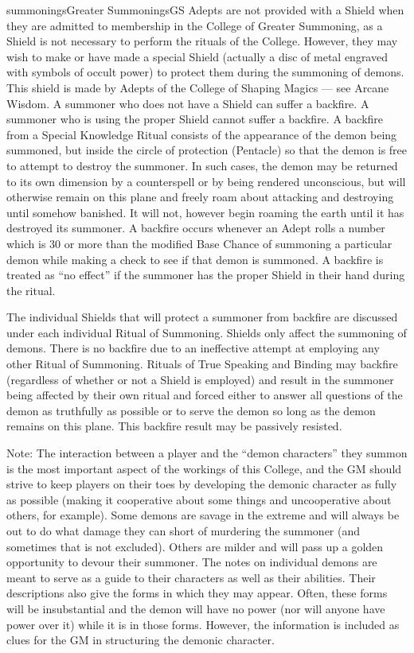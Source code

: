 \begin{College}[1.0]{summonings}{Greater Summonings}{GS}
Adepts are not provided with a Shield when they are admitted to
membership in the College of Greater Summoning, as a Shield is not
necessary to perform the rituals of the College.  However, they may
wish to make or have made a special Shield (actually a disc of metal
engraved with symbols of occult power) to protect them during the
summoning of demons.  This shield is made by Adepts of the College
of Shaping Magics — see Arcane Wisdom. A summoner who does not have a
Shield can suffer a backfire.  A summoner who is using the proper
Shield cannot suffer a backfire.  A backfire from a Special Knowledge
Ritual consists of the appearance of the demon being summoned, but
inside the circle of protection (Pentacle) so that the demon is free
to attempt to destroy the summoner.  In such cases, the demon may be
returned to its own dimension by a counterspell or by being rendered
unconscious, but will otherwise remain on this plane and freely roam
about attacking and destroying until somehow banished.  It will not,
however begin roaming the earth until it has destroyed its summoner. A
backfire occurs whenever an Adept rolls a number which is 30 or more
than the modified Base Chance of summoning a particular demon while
making a check to see if that demon is summoned.  A backfire is
treated as “no effect” if the summoner has the proper Shield in their
hand during the ritual.

The individual Shields that will protect a summoner from backfire are
discussed under each individual Ritual of Summoning.  Shields only
affect the summoning of demons. There is no backfire due to an
ineffective attempt at employing any other Ritual of Summoning.
Rituals of True Speaking and Binding may backfire (regardless of
whether or not a Shield is employed) and result in the summoner being
affected by their own ritual and forced either to answer all questions
of the demon as truthfully as possible or to serve the demon so long
as the demon remains on this plane.  This backfire result may be
passively resisted.

Note: The interaction between a player and the “demon characters” they
summon is the most important aspect of the workings of this College,
and the GM should strive to keep players on their toes by developing
the demonic character as fully as possible (making it cooperative
about some things and uncooperative about others, for example).  Some
demons are savage in the extreme and will always be out to do what
damage they can short of murdering the summoner (and sometimes that is
not excluded). Others are milder and will pass up a golden opportunity
to devour their summoner. The notes on individual demons are meant to
serve as a guide to their characters as well as their abilities.
Their descriptions also give the forms in which they may appear.
Often, these forms will be insubstantial and the demon will have no
power (nor will anyone have power over it) while it is in those forms.
However, the information is included as clues for the GM in
structuring the demonic character.


\end{College}
